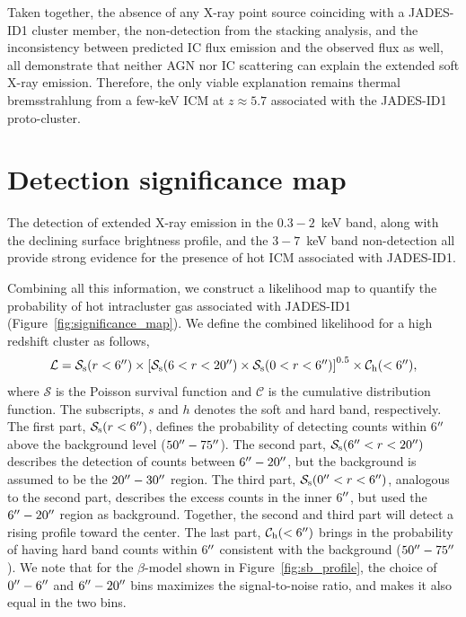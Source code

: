 \documentclass[pdflatex,sn-mathphys-num]{sn-jnl}
\newcommand{\arcsec}{\mbox{\ensuremath{^{\prime\prime}}}}
\theoremstyle{thmstyleone}
\theoremstyle{thmstyletwo}
\theoremstyle{thmstylethree}
\begin{document}
Taken together, the absence of any X-ray point source coinciding with a JADES-ID1 cluster member, the non-detection from the stacking analysis, and the inconsistency between predicted IC flux emission and the observed flux as well, all demonstrate that neither AGN nor IC scattering can explain the extended soft X-ray emission. Therefore, the only viable explanation remains thermal bremsstrahlung from a few-keV ICM at $z\approx5.7$ associated with the JADES-ID1 proto-cluster.

\section{Detection significance map}
\label{sec:significance_map}

The detection of extended X-ray emission in the $0.3-2$~keV band, along with the declining surface brightness profile, and the $3-7$~keV band non-detection all provide strong evidence for the presence of hot ICM associated with JADES-ID1.

Combining all this information, we construct a likelihood map to quantify the probability of hot intracluster gas associated with JADES-ID1 (Figure~\ref{fig:significance_map}).
We define the combined likelihood for a high redshift cluster as follows,
\begin{equation}
    \mathcal{L} = \mathcal{S}_{\rm s}(r<6\arcsec) \times \left[ \mathcal{S}_{\rm s} (6<r<20\arcsec) \times \mathcal{S}_{\rm s} (0<r<6\arcsec) \right]^{0.5} \times \mathcal{C}_{\rm h} (<6\arcsec),
\end{equation}
where $\mathcal{S}$ is the Poisson survival function and $\mathcal{C}$ is the cumulative distribution function. The subscripts, $s$ and $h$ denotes the soft and hard band, respectively.
The first part, $\mathcal{S}_{\rm s}(r<6\arcsec)$, defines the probability of detecting counts within 6$\arcsec$ above the background level ($50\arcsec-75\arcsec$). The second part, $\mathcal{S}_{\rm s} (6\arcsec<r<20\arcsec)$ describes the detection of counts between $6\arcsec-20\arcsec$, but the background is assumed to be the $20\arcsec-30\arcsec$ region. The third part, $\mathcal{S}_{\rm s} (0\arcsec<r<6\arcsec)$, analogous to the second part, describes the excess counts in the inner 6$\arcsec$, but used the $6\arcsec-20\arcsec$ region as background. Together, the second and third part will detect a rising profile toward the center. The last part, $\mathcal{C}_{\rm h} (<6\arcsec)$ brings in the probability of having hard band counts within 6$\arcsec$ consistent with the background ($50\arcsec-75\arcsec$). We note that for the $\beta$-model shown in Figure~\ref{fig:sb_profile}, the choice of $0\arcsec-6\arcsec$ and $6\arcsec-20\arcsec$ bins maximizes the signal-to-noise ratio, and makes it also equal in the two bins.
\end{document}
